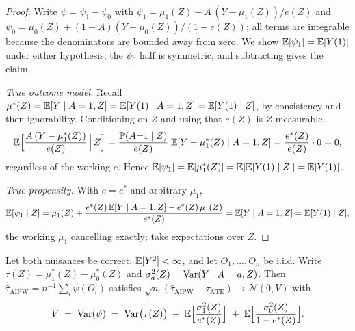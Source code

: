 \begin{proof}
Write $\psi = \psi_1 - \psi_0$ with $\psi_1 = \mu_1(Z) + A\,(Y - \mu_1(Z))/e(Z)$ and $\psi_0 =
\mu_0(Z) + (1-A)(Y - \mu_0(Z))/(1 - e(Z))$; all terms are integrable because the denominators are
bounded away from zero. We show $\mathbb{E}[\psi_1] = \mathbb{E}[Y(1)]$ under either hypothesis; the $\psi_0$ half
is symmetric, and subtracting gives the claim.

\emph{True outcome model.} Recall $\mu_1^*(Z) = \mathbb{E}[Y \mid A=1, Z] = \mathbb{E}[Y(1) \mid A=1, Z] = \mathbb{E}[Y(1)
\mid Z]$, by consistency and then ignorability. Conditioning on $Z$ and using that $e(Z)$ is
$Z$-measurable,
\[
\mathbb{E}\Big[\frac{A\,(Y - \mu_1^*(Z))}{e(Z)} \,\Big|\, Z\Big]
= \frac{\mathbb{P}(A{=}1 \mid Z)}{e(Z)}\;\mathbb{E}[Y - \mu_1^*(Z) \mid A=1, Z]
= \frac{e^*(Z)}{e(Z)} \cdot 0 = 0 ,
\]
regardless of the working $e$. Hence $\mathbb{E}[\psi_1] = \mathbb{E}[\mu_1^*(Z)] = \mathbb{E}[\mathbb{E}[Y(1) \mid Z]] = \mathbb{E}[Y(1)]$.

\emph{True propensity.} With $e = e^*$ and arbitrary $\mu_1$,
\[
\mathbb{E}[\psi_1 \mid Z]
= \mu_1(Z) + \frac{e^*(Z)\,\mathbb{E}[Y \mid A=1, Z] - e^*(Z)\,\mu_1(Z)}{e^*(Z)}
= \mathbb{E}[Y \mid A=1, Z] = \mathbb{E}[Y(1) \mid Z],
\]
the working $\mu_1$ cancelling exactly; take expectations over $Z$.
\end{proof}

\begin{proposition}
\label{prop:app-aipwvar}
Let both nuisances be correct, $\mathbb{E}[Y^2] < \infty$, and let $O_1, \dots, O_n$ be i.i.d. Write
$\tau(Z) = \mu_1^*(Z) - \mu_0^*(Z)$ and $\sigma_a^2(Z) = \mathrm{Var}(Y \mid A=a, Z)$. Then
$\hat\tau_{\mathrm{AIPW}} = n^{-1}\sum_i \psi(O_i)$ satisfies $\sqrt{n}\,(\hat\tau_{\mathrm{AIPW}} -
\tau_{\mathrm{ATE}}) \to \mathcal{N}(0, V)$ with
\[
V \;=\; \mathrm{Var}(\psi) \;=\; \mathrm{Var}\big(\tau(Z)\big)
\;+\; \mathbb{E}\Big[\frac{\sigma_1^2(Z)}{e^*(Z)}\Big]
\;+\; \mathbb{E}\Big[\frac{\sigma_0^2(Z)}{1 - e^*(Z)}\Big].
\]
\end{proposition}

